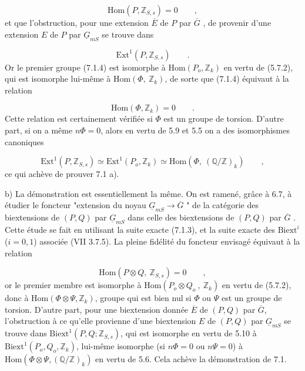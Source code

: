 
\begin{equation}\tag{7.1.4}
 \mathrm{Hom}(P,\mathbb{Z}_{S,s}) = 0 \qquad ,
\end{equation}
et que l'obstruction, pour une extension $\overline{E}$ de $P$ par $\overline{G}$ , de provenir d'une extension $E$ de $P$ par $\underline{G}_{mS}$ se trouve dans

\begin{equation}\tag{7.1.5}
\mathrm{Ext}^1(P,\mathbb{Z}_{S,s}) \qquad .
\end{equation}
Or le premier groupe (7.1.4) est isomorphe à $\mathrm{Hom}(P_o,\mathbb{Z}_k)$ en vertu de (5.7.2), qui est isomorphe lui-même à $\mathrm{Hom}(\Phi,\ \mathbb{Z}_k)$, de sorte que (7.1.4) équivaut à la relation

\begin{equation}\tag{7.1.4 bis}
\mathrm{Hom}(\Phi,\mathbb{Z}_k) = 0 \qquad .
\end{equation}
Cette relation est certainement vérifiée si $\Phi$ est un groupe de torsion. D'autre part, si on a même $n\Phi = 0$, alors en vertu de 5.9 et 5.5 on a des isomorphismes canoniques

\begin{equation}\tag{7.1.6}
\mathrm{Ext}^1(P,\mathbb{Z}_{S,s}) \simeq \mathrm{Ext}^1(P_o,\mathbb{Z}_k) \simeq \mathrm{Hom}(\Phi,\ (\mathbb{Q}/\mathbb{Z})_k) \qquad ,
\end{equation}
ce qui achève de prouver 7.1 a).

b)  La démonstration est essentiellement la même. On est ramené, grâce à 6.7, à étudier le foncteur "extension du noyau $\underline{G}_{mS} \longrightarrow \overline{G}$ " de la catégorie des biextensions de $(P,Q)$ par $\underline{G}_{mS}$ dans celle des biextensions de $(P,Q)$ par $\overline{G}$ . Cette étude se fait en utilisant la suite exacte (7.1.3), et la suite exacte des $\mathrm{Biext}^i$ ($i=0,1$) associée (VII 3.7.5). La pleine fidélité du foncteur envisagé équivaut à la relation

\begin{equation}\tag{7.1.7}
\mathrm{Hom}(P \otimes Q,\ \mathbb{Z}_{S,s}) = 0 \qquad ,
\end{equation}
or le premier membre est isomorphe à $\mathrm{Hom}(P_o \otimes Q_o\ ,\ \mathbb{Z}_k)$ en vertu de (5.7.2),
donc à $\mathrm{Hom}(\Phi \otimes \Psi, \mathbb{Z}_k)$, groupe qui est bien nul si $\Phi$ ou $\Psi$ est un groupe de torsion. D'autre part, pour une biextension donnée $\overline{E}$ de $(P,Q)$ par $\overline{G}$, l'obstruction à ce qu'elle provienne d'une biextension $E$ de $(P,Q)$ par $\underline{G}_{mS}$ se trouve dans $\mathrm{Biext}^1(P,Q;\mathbb{Z}_{S,s})$, qui est isomorphe en vertu de 5.10 à $\mathrm{Biext}^1(P_o,Q_o, \mathbb{Z}_k)$, lui-même isomorphe (si $n\Phi = 0$ ou $n\Psi = 0$) à $\mathrm{Hom}(\Phi \otimes \Psi, (\mathbb{Q}/\mathbb{Z})_k)$ en vertu de 5.6. Cela achève la démonstration de 7.1.

